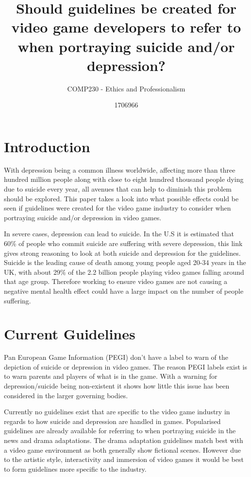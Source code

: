 \documentclass{scrartcl}
\title{Should guidelines be created for video game developers to
	refer to when portraying suicide and/or depression?}
\subtitle{COMP230 - Ethics and Professionalism}
\author{1706966}
\begin{document}
	
	\maketitle
	
	\abstract{}
	
	\section{Introduction}
		With depression being a common illness worldwide, affecting more than three hundred million people along with close to eight hundred thousand people dying due to suicide every year\cite{DepressionStats}, all avenues that can help to diminish this problem should be explored. This paper takes a look into what possible effects could be seen if guidelines were created for the video game industry to consider when portraying suicide and/or depression in video games.
		
		In severe cases, depression can lead to suicide. In the U.S it is estimated that 60\% of people who commit suicide are suffering with severe depression\cite{SuicideToDepression}, this link gives strong reasoning to look at both suicide and depression for the guidelines. Suicide is the leading cause of death among young people aged 20-34 years in the UK\cite{youngAge}, with about 29\%\cite{sales2018essential} of the 2.2 billion\cite{globalGame} people playing video games falling around that age group. Therefore working to ensure video games are not causing a negative mental health effect could have a large impact on the number of people suffering.
	
	\section{Current Guidelines}
		Pan European Game Information (PEGI) don't have a label to warn of the depiction of suicide or depression in video games\cite{pegiNoRating}. The reason PEGI labels exist is to warn parents and players of what is in the game. With a warning for depression/suicide being non-existent it shows how little this issue has been considered in the larger governing bodies.
		
		Currently no guidelines exist that are specific to the video game industry in regards to how suicide and depression are handled in games. Popularised guidelines are already available for referring to when portraying suicide in the news\cite{world2017preventing}\cite{nepon2009media} and drama adaptations\cite{DramaGuidelines}.		
		The drama adaptation guidelines match best with a video game environment as both generally show fictional scenes. However due to the artistic style, interactivity and immersion of video games it would be best to form guidelines more specific to the industry. 	
\end{document}
